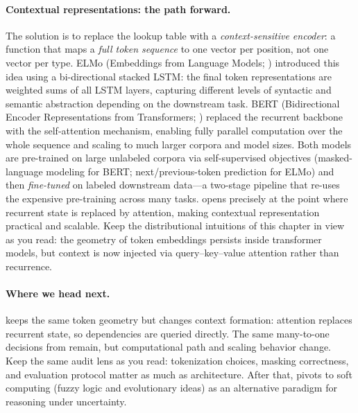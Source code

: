 \paragraph{Contextual representations: the path forward.}
The solution is to replace the lookup table with a \emph{context-sensitive encoder}: a function that maps a \emph{full token sequence} to one vector per position, not one vector per type. ELMo (Embeddings from Language Models; \citealp{Peters2018}) introduced this idea using a bi-directional stacked LSTM: the final token representations are weighted sums of all LSTM layers, capturing different levels of syntactic and semantic abstraction depending on the downstream task. BERT (Bidirectional Encoder Representations from Transformers; \citealp{Devlin2019}) replaced the recurrent backbone with the self-attention mechanism, enabling fully parallel computation over the whole sequence and scaling to much larger corpora and model sizes. Both models are pre-trained on large unlabeled corpora via self-supervised objectives (masked-language modeling for BERT; next/previous-token prediction for ELMo) and then \emph{fine-tuned} on labeled downstream data---a two-stage pipeline that re-uses the expensive pre-training across many tasks.  opens precisely at the point where recurrent state is replaced by attention, making contextual representation practical and scalable. Keep the distributional intuitions of this chapter in view as you read: the geometry of token embeddings persists inside transformer models, but context is now injected via query--key--value attention rather than recurrence.

\medskip
\paragraph{Where we head next.}  keeps the same token geometry but changes context formation: attention replaces recurrent state, so dependencies are queried directly. The same many\hyp{}to\hyp{}one decisions from  remain, but computational path and scaling behavior change. Keep the same audit lens as you read: tokenization choices, masking correctness, and evaluation protocol matter as much as architecture. After that,  pivots to soft computing (fuzzy logic and evolutionary ideas) as an alternative paradigm for reasoning under uncertainty.

\nocite{Mikolov2013, Pennington2014, LevyGoldberg2014, Devlin2019}
